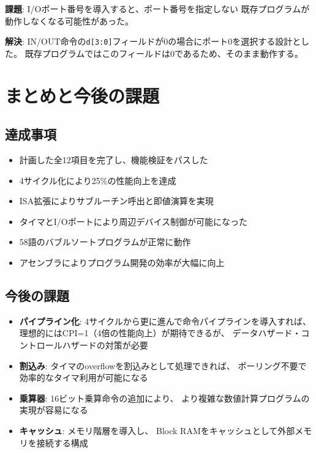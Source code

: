 \documentclass[a4paper,11pt]{ltjsarticle}
\begin{document}
\textbf{課題}: I/Oポート番号を導入すると、ポート番号を指定しない
既存プログラムが動作しなくなる可能性があった。

\textbf{解決}: IN/OUT命令の\texttt{d[3:0]}フィールドが0の場合にポート0を選択する設計とした。
既存プログラムではこのフィールドは0であるため、そのまま動作する。


\section{まとめと今後の課題}

\subsection{達成事項}

\begin{itemize}
\item 計画した全12項目を完了し、機能検証をパスした
\item 4サイクル化により25\%の性能向上を達成
\item ISA拡張によりサブルーチン呼出と即値演算を実現
\item タイマとI/Oポートにより周辺デバイス制御が可能になった
\item 58語のバブルソートプログラムが正常に動作
\item アセンブラによりプログラム開発の効率が大幅に向上
\end{itemize}

\subsection{今後の課題}

\begin{itemize}
\item \textbf{パイプライン化}: 4サイクルから更に進んで命令パイプラインを導入すれば、
  理想的にはCPI=1（4倍の性能向上）が期待できるが、
  データハザード・コントロールハザードの対策が必要
\item \textbf{割込み}: タイマのoverflowを割込みとして処理できれば、
  ポーリング不要で効率的なタイマ利用が可能になる
\item \textbf{乗算器}: 16ビット乗算命令の追加により、
  より複雑な数値計算プログラムの実現が容易になる
\item \textbf{キャッシュ}: メモリ階層を導入し、
  Block RAMをキャッシュとして外部メモリを接続する構成
\end{itemize}
\end{document}
